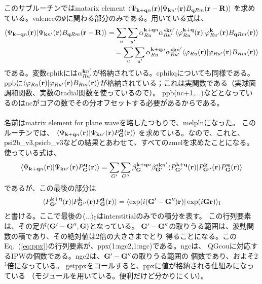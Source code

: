 \documentclass[twocolumn,showpacs,preprintnumbers,amsmath,amssymb,floatfix]{revtex4-1}
\newcommand{\bfq}{{\bf q}}
\newcommand{\bfk}{{\bf k}}
\newcommand{\bfr}{{\bf r}}
\newcommand{\bfG}{{\bf G}}
\newcommand{\bfR}{{\bf R}}
\newcommand{\req}[1]{\mbox{Eq.~\!(\ref{#1})}}
\def\Psikqn{{\Psi_{{\bf k}+{\bf q} n}}}
\begin{document}
\begin{widetext}
　\\

 \\
このサブルーチンではmatarix element 
$\langle\Psikqn(\bfr)| \Psi_{\bfk n'}(\bfr) B_{\bfq Rm}(\bfr-\bfR) \rangle$
を求めている。valenceの$\Psi$に関わる部分のみである。用いている式は、
\begin{eqnarray}
\langle\Psikqn(\bfr)| \Psi_{\bfk n'}(\bfr) B_{\bfq Rm}(\bfr-\bfR) \rangle
= \sum_{u} \sum_{u'} \alpha^{\bfk+\bfq n}_{Ru} \alpha^{* \bfk n'}_{Ru'}
\langle \varphi^{\bf k+q}_{Ru}(\bfr)|\varphi^{\bf k}_{Ru'}(\bfr) B_{\bfq
Rm}(\bfr) \rangle \nonumber \\
=
\sum_{u} \sum_{u'} \alpha^{\bfk+\bfq n}_{Ru} \alpha^{* \bfk n'}_{Ru'}
\langle \varphi_{Ru}(\bfr)|\varphi_{Ru'}(\bfr) B_{Rm}(\bfr) \rangle
\end{eqnarray}
である。変数cphikには$\alpha^{\bfk n'}_{Ru'}$が格納されている。cphikqについても同様である。
ppbに$\langle \varphi_{Ru}(\bfr)|\varphi_{Ru'}(\bfr)
B_{Rm}(\bfr)\rangle$が格納されている；これは実関数である（実球面調和関数、実数のradial関数を使っているので）。
ppb(nc+1,...)などとなっているのはncがコアの数でその分オフセットする必要があるからである。\\


\\
名前はmatrix element for plane waveを略したつもりで、melplnになった。
このルーチンでは、
$\langle\Psikqn(\bfr)| \Psi_{\bfk n'}(\bfr) P^{\bf q}_{\bf G}({\bf r}) \rangle$
を求めている。なので、これと、psi2b\_v3,psicb\_v3などの結果とあわせて、すべてのzmelを求めたことになる。
使っている式は、
\begin{eqnarray}
\langle\Psikqn(\bfr)| \Psi_{\bfk n'}(\bfr) P^{\bf q}_{\bf G}(\bfr) \rangle
= \sum_{G'} \sum_{G''} \beta^{\bfk+\bfq n}_{\bfG} \beta^{* \bfk n'}_{\bfG'}
\langle P^{\bf k+q}_{\bf G'}(\bfr)| P^{\bf k}_{\bf G''}(\bfr) 
P^{\bf q}_{\bf G}({\bf r}) \rangle \label{eq:ppip} 
\end{eqnarray}
であるが、この最後の部分は
\begin{eqnarray}
\langle P^{\bf k+q}_{\bf G'}(\bfr)| P^{\bf k}_{\bf G''}(\bfr) 
P^{\bf q}_{\bf G}({\bf r})\rangle
=\langle \exp(i (\bfG'- \bfG'')\bfr) |\exp(i \bfG\bfr)\rangle_{\rm I}
\label{eq:ppx}
\end{eqnarray}
と書ける。ここで最後の$\langle ... \rangle_{\rm I}$はinterstitialのみでの積分を表す。
この行列要素は、その足が$(\bfG'- \bfG'', \bfG)$となっている。
$\bfG'- \bfG''$の取りうる範囲は、波動関数の積であり、その絶対値は2倍の大きさまでとり
得ることになる。この\req{eq:ppx}の行列要素が、ppx(1:ngc2,1:ngc)である。ngcは、
QGcouに対応するIPWの個数である。ngc2は、$\bfG'- \bfG''$の取りうる範囲の
個数であり、およそ2$^3$倍になっている。
getppxをコールすると、ppxに値が格納される仕組みになっている
（モジュールを用いている。便利だけど分かりにくい）。


\end{widetext}
\end{document}
